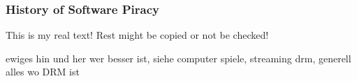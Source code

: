 \subsubsection{History of Software Piracy} \label{subsubsection:foundation-piracy-overview-history}
This is my real text! Rest might be copied or not be checked!


ewiges hin und her wer besser ist, siehe computer spiele, streaming drm, generell alles wo DRM ist\newline
